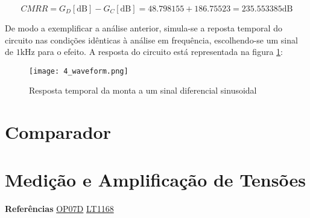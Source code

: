 \documentclass[a4paper, 2pt]{report}
\begin{document}
\begin{equation}
    \textit{CMRR} = G_D[\text{dB}] - G_C[\text{dB}] = 48.798155 + 186.75523 = 235.553385 \text{dB}
    \label{4_3}
\end{equation}

\par De modo a exemplificar a análise anterior, simula-se a reposta temporal do circuito nas condições idênticas à análise em frequência, escolhendo-se um sinal de \(1 \text{kHz}\) para o efeito. A resposta do circuito está representada na figura \ref{3_wave}:

\begin{figure}[H]
    \centering
    \texttt{[image: 4\_waveform.png]}
    \caption{Resposta temporal da monta a um sinal diferencial sinusoidal}
    \label{3_wave}
\end{figure}



\chapter{Comparador}
\chapter{Medição e Amplificação de Tensões}

\huge{\textbf{Referências}} \newline
\newline
\normalsize
\href{https://www.ti.com/lit/ds/symlink/op07d.pdf}{OP07D} \newline
\href{https://www.analog.com/media/en/technical-documentation/data-sheets/1168fa.pdf}{LT1168} \newline
\end{document}
